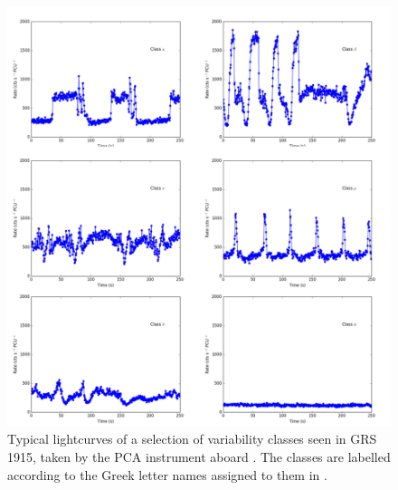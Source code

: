 \begin{figure}
  \centering
  \includegraphics[width=.9\linewidth, trim= 25mm 0mm 0mm 0mm]{images/GRSsample.png}
  \caption{\small Typical lightcurves of a selection of variability classes seen in GRS 1915, taken by the PCA instrument aboard \rxte .  The classes are labelled according to the Greek letter names assigned to them in \citet{Belloni_GRS_MI}.}
  \label{fig:GRSsample}
\end{figure}

